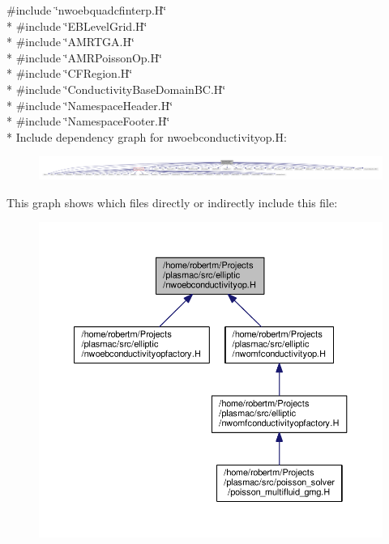 {\ttfamily \#include \char`\"{}nwoebquadcfinterp.\+H\char`\"{}}\\*
{\ttfamily \#include \char`\"{}E\+B\+Level\+Grid.\+H\char`\"{}}\\*
{\ttfamily \#include \char`\"{}A\+M\+R\+T\+G\+A.\+H\char`\"{}}\\*
{\ttfamily \#include \char`\"{}A\+M\+R\+Poisson\+Op.\+H\char`\"{}}\\*
{\ttfamily \#include \char`\"{}C\+F\+Region.\+H\char`\"{}}\\*
{\ttfamily \#include \char`\"{}Conductivity\+Base\+Domain\+B\+C.\+H\char`\"{}}\\*
{\ttfamily \#include \char`\"{}Namespace\+Header.\+H\char`\"{}}\\*
{\ttfamily \#include \char`\"{}Namespace\+Footer.\+H\char`\"{}}\\*
Include dependency graph for nwoebconductivityop.\+H\+:\nopagebreak
\begin{figure}[H]
\begin{center}
\leavevmode
\includegraphics[width=350pt]{nwoebconductivityop_8H__incl}
\end{center}
\end{figure}
This graph shows which files directly or indirectly include this file\+:\nopagebreak
\begin{figure}[H]
\begin{center}
\leavevmode
\includegraphics[width=350pt]{nwoebconductivityop_8H__dep__incl}
\end{center}
\end{figure}
